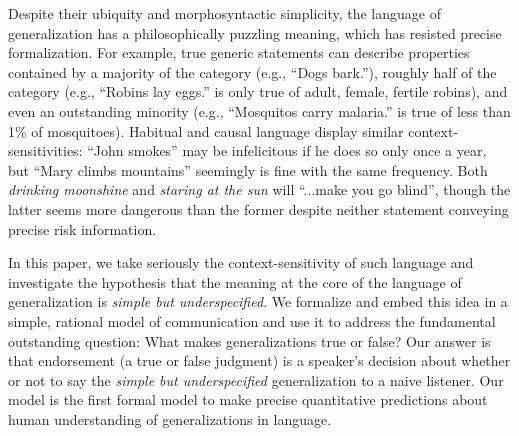 \documentclass[11pt,letterpaper]{letter} %
\begin{document}
\begin{letter}
Despite their ubiquity and morphosyntactic simplicity, the language of generalization has a philosophically puzzling meaning, which has resisted precise formalization. 
For example, true generic statements can describe properties contained by a majority of the category (e.g., ``Dogs bark.''), roughly half of the category (e.g., ``Robins lay eggs.'' is only true of adult, female, fertile robins), and even an outstanding minority (e.g., ``Mosquitos carry malaria.'' is true of less than 1\% of mosquitoes). 
Habitual and causal language display similar context-sensitivities:
``John smokes'' may be infelicitous if he does so only once a year, but ``Mary climbs mountains'' seemingly is fine with the same frequency.
Both \emph{drinking moonshine}  and \emph{staring at the sun} will ``...make you go blind'', though the latter seems more dangerous than the former despite neither statement conveying precise risk information.


In this paper, we take seriously the context-sensitivity of such language and investigate the hypothesis that the meaning at the core of the language of generalization is \emph{simple but underspecified}. 
We formalize and embed this idea in a simple, rational model of communication and use it to address the fundamental outstanding question: What makes generalizations true or false?
Our answer is that endorsement (a true or false judgment) is a speaker's decision about whether or not to say the \emph{simple but underspecified} generalization to a naive listener.
Our model is the first formal model to make precise quantitative predictions about human understanding of generalizations in language.


\end{letter}
\end{document}

